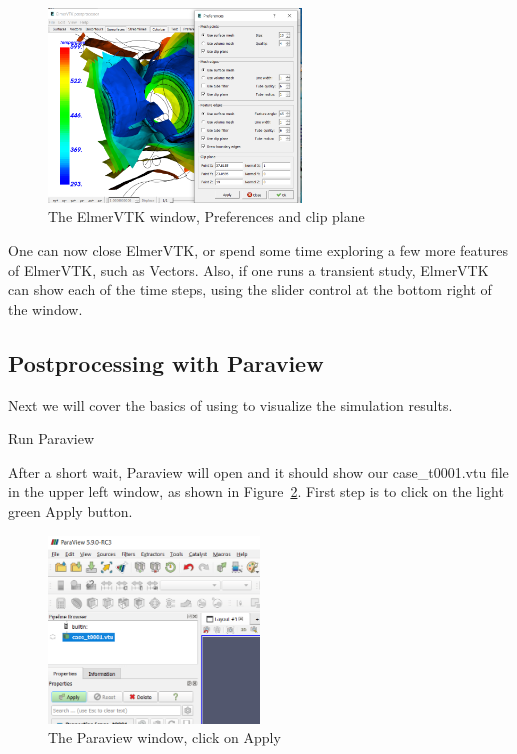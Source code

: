 \begin{figure}[H]
\begin{center}
\includegraphics[width=0.6\textwidth]{vtk-8}
\caption{The ElmerVTK window, Preferences and clip plane}\label{fg:vtk-8}
\end{center}
\end{figure}

One can now close ElmerVTK, or spend some time exploring a few more features of ElmerVTK, such as Vectors.  Also, if one runs a transient study, ElmerVTK can show each of the time steps, using the slider control at the bottom right of the window.

\subsection*{Postprocessing with Paraview}

Next we will cover the basics of using  to visualize the simulation results.

\ttbegin
Run
  Paraview
\ttend

After a short wait, Paraview will open and it should show our case\_t0001.vtu file in the upper left window, as shown in Figure~\ref{fg:paraview-1}.  First step is to click on the light green Apply button.

\begin{figure}[H]
\begin{center}
\includegraphics[width=0.5\textwidth]{paraview-1}
\caption{The Paraview window, click on Apply}\label{fg:paraview-1}
\end{center}
\end{figure}

